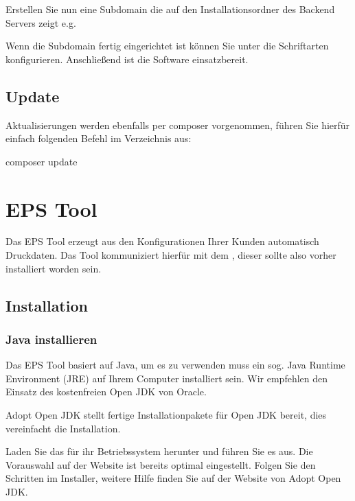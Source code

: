 \documentclass[letterpaper,10pt,ngerman]{sphinxmanual}
\begin{document}
Erstellen Sie nun eine Subdomain die auf den Installationsordner des Backend Servers zeigt e.g. 

Wenn die Subdomain fertig eingerichtet ist können Sie unter  die Schriftarten
konfigurieren. Anschließend ist die Software einsatzbereit.


\subsection{Update}
\label{\detokenize{tools/backend:update}}
Aktualisierungen werden ebenfalls per composer vorgenommen, führen Sie hierfür einfach folgenden Befehl im Verzeichnis aus:

\begin{sphinxVerbatim}[commandchars=\\\{\}]
composer update
\end{sphinxVerbatim}


\section{EPS Tool}
\label{\detokenize{tools/epstool:eps-tool}}\label{\detokenize{tools/epstool::doc}}
Das EPS Tool erzeugt aus den Konfigurationen Ihrer Kunden automatisch Druckdaten.
Das Tool kommuniziert hierfür mit dem {\hyperref[\detokenize{tools/backend::doc}]{}}, dieser sollte also vorher installiert worden sein.


\subsection{Installation}
\label{\detokenize{tools/epstool:installation}}

\subsubsection{Java installieren}
\label{\detokenize{tools/epstool:java-installieren}}
Das EPS Tool basiert auf Java, um es zu verwenden muss ein sog. Java Runtime Environment (JRE) auf Ihrem
Computer installiert sein. Wir empfehlen den Einsatz des kostenfreien Open JDK von Oracle.

Adopt Open JDK stellt fertige Installationpakete für Open JDK bereit, dies vereinfacht die Installation.

Laden Sie das  für ihr Betriebssystem herunter und führen Sie es aus.
Die Vorauswahl auf der Website ist bereits optimal eingestellt. Folgen Sie den Schritten im Installer, weitere Hilfe finden Sie auf der Website von Adopt Open JDK.
\end{document}
